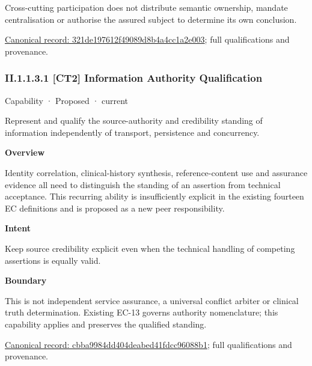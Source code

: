 Cross-cutting participation does not distribute semantic ownership, mandate centralisation or authorise the assured subject to determine its own conclusion.


{\footnotesize \href{../../../../../../../continuum/strategy/capability/321de197612f49089d8b4a4cc1a2e003.md}{Canonical record: 321de197612f49089d8b4a4cc1a2e003}; full qualifications and provenance.}\par
\subsubsection*{II.1.1.3.1 [CT2] Information Authority Qualification}
\label{navigation:II.1.1.3.1}

\label{element:cbba9984dd404deabed41fdcc96088b1}
{\small Capability · Proposed · current}\par

Represent and qualify the source-authority and credibility standing of information independently of transport, persistence and concurrency.



\textbf{Overview}



Identity correlation, clinical-history synthesis, reference-content use and assurance evidence all need to distinguish the standing of an assertion from technical acceptance. This recurring ability is insufficiently explicit in the existing fourteen EC definitions and is proposed as a new peer responsibility.



\textbf{Intent}



Keep source credibility explicit even when the technical handling of competing assertions is equally valid.



\textbf{Boundary}



This is not independent service assurance, a universal conflict arbiter or clinical truth determination. Existing EC-13 governs authority nomenclature; this capability applies and preserves the qualified standing.


{\footnotesize \href{../../../../../../../continuum/strategy/capability/cbba9984dd404deabed41fdcc96088b1.md}{Canonical record: cbba9984dd404deabed41fdcc96088b1}; full qualifications and provenance.}\par
